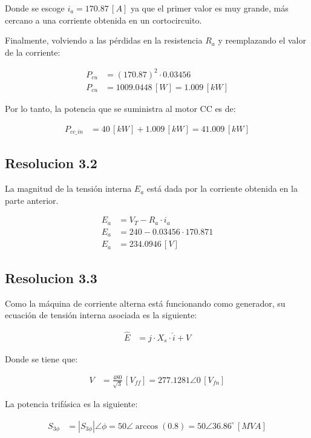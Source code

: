 \documentclass[
  11pt,
  letterpaper,
   addpoints,
   answers
  ]{exam}
\begin{document}
\begin{questions}
\begin{solution}
    Donde se escoge \( i_a = 170.87 \, [A] \) ya que el primer valor es muy grande, más cercano a una corriente obtenida en un cortocircuito.
    
    Finalmente, volviendo a las pérdidas en la resistencia \( R_a \) y reemplazando el valor de la corriente:
    
    \begin{align}
    P_{cu} &= (170.87)^2 \cdot 0.03456 \\
    P_{cu} &= 1009.0448 \, [W] = 1.009 \, [kW]
    \end{align}
    
    Por lo tanto, la potencia que se suministra al motor CC es de:
    
    \begin{align}
    P_{cc\_in} &= 40 \, [kW] + 1.009 \, [kW] = 41.009 \, [kW]
    \end{align}
    \subsection*{Resolucion 3.2}
    La magnitud de la tensión interna \( E_a \) está dada por la corriente obtenida en la parte anterior.

\begin{align}
E_a &= V_T - R_a \cdot i_a \\
E_a &= 240 - 0.03456 \cdot 170.871 \\
E_a &= 234.0946 \, [V]
\end{align}
\subsection*{Resolucion 3.3 }
Como la máquina de corriente alterna está funcionando como generador, su ecuación de tensión interna asociada es la siguiente:

\begin{align}
\hat{E} &= j \cdot X_s \cdot \hat{i} + V
\end{align}

Donde se tiene que:

\begin{align}
V &= \frac{480}{\sqrt{3}} \, [V_{ff}] = 277.1281 \angle 0 \, [V_{fn}]
\end{align}

La potencia trifásica es la siguiente:

\begin{align}
S_{3\phi} &= |S_{3\phi}| \angle \phi = 50 \angle \arccos(0.8) = 50 \angle 36.86^\circ \, [MV A]
\end{align}


\end{solution}
\end{questions}
\end{document}
